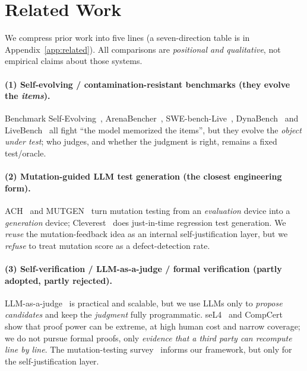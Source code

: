 \documentclass{article}
\begin{document}
\section{Related Work}
\label{sec:related}
We compress prior work into five lines (a seven-direction table is in Appendix~\ref{app:related}).
All comparisons are \emph{positional and qualitative}, not empirical claims about those systems.

\paragraph{(1) Self-evolving / contamination-resistant benchmarks (they evolve the \emph{items}).}
Benchmark Self-Evolving~\cite{wang2024benchmarkevolving}, ArenaBencher~\cite{liu2025arenabencher},
SWE-bench-Live~\cite{zhang2025swebenchlive}, DynaBench~\cite{kiela2021dynabench} and
LiveBench~\cite{white2024livebench} all fight ``the model memorized the items'', but they evolve
the \emph{object under test}; who judges, and whether the judgment is right, remains a fixed
test/oracle.

\paragraph{(2) Mutation-guided LLM test generation (the closest engineering form).}
ACH~\cite{foster2025ach} and MUTGEN~\cite{wang2025mutgen} turn mutation testing from an
\emph{evaluation} device into a \emph{generation} device; Cleverest~\cite{liu2025cleverest} does
just-in-time regression test generation. We \emph{reuse} the mutation-feedback idea as an internal
self-justification layer, but we \emph{refuse} to treat mutation score as a defect-detection rate.

\paragraph{(3) Self-verification / LLM-as-a-judge / formal verification (partly adopted, partly rejected).}
LLM-as-a-judge~\cite{zheng2023judging} is practical and scalable, but we use LLMs only to
\emph{propose candidates} and keep the \emph{judgment} fully programmatic. seL4~\cite{klein2009sel4}
and CompCert~\cite{leroy2009compcert} show that proof power can be extreme, at high human cost and
narrow coverage; we do not pursue formal proofs, only \emph{evidence that a third party can
recompute line by line}. The mutation-testing survey~\cite{jia2011mutation} informs our framework,
but only for the self-justification layer.
\end{document}
